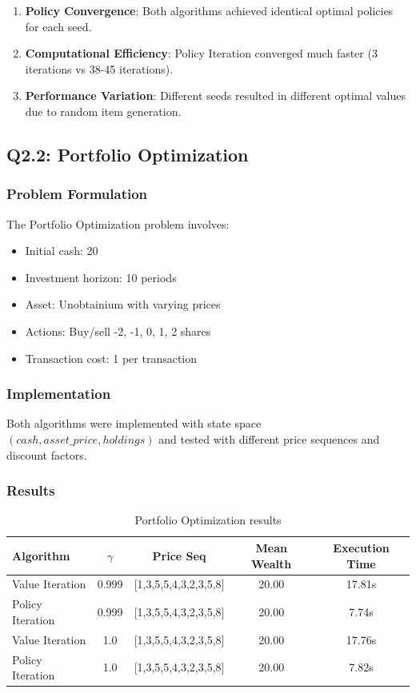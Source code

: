 \documentclass[10pt,a4paper]{article}
\begin{document}
\begin{enumerate}
    \item \textbf{Policy Convergence}: Both algorithms achieved identical optimal policies for each seed.
    
    \item \textbf{Computational Efficiency}: Policy Iteration converged much faster (3 iterations vs 38-45 iterations).
    
    \item \textbf{Performance Variation}: Different seeds resulted in different optimal values due to random item generation.
\end{enumerate}

\subsection{Q2.2: Portfolio Optimization}

\subsubsection{Problem Formulation}

The Portfolio Optimization problem involves:
\begin{itemize}
    \item Initial cash: 20
    \item Investment horizon: 10 periods
    \item Asset: Unobtainium with varying prices
    \item Actions: Buy/sell {-2, -1, 0, 1, 2} shares
    \item Transaction cost: 1 per transaction
\end{itemize}

\subsubsection{Implementation}

Both algorithms were implemented with state space $(cash, asset\_price, holdings)$ and tested with different price sequences and discount factors.

\subsubsection{Results}

\begin{table}[H]
\centering
\caption{Portfolio Optimization results}
\begin{tabular}{lcccc}
\toprule
Algorithm & $\gamma$ & Price Seq & Mean Wealth & Execution Time \\
\midrule
Value Iteration & 0.999 & [1,3,5,5,4,3,2,3,5,8] & 20.00 & 17.81s \\
Policy Iteration & 0.999 & [1,3,5,5,4,3,2,3,5,8] & 20.00 & 7.74s \\
Value Iteration & 1.0 & [1,3,5,5,4,3,2,3,5,8] & 20.00 & 17.76s \\
Policy Iteration & 1.0 & [1,3,5,5,4,3,2,3,5,8] & 20.00 & 7.82s \\
\bottomrule
\end{tabular}
\end{table}
\end{document}
